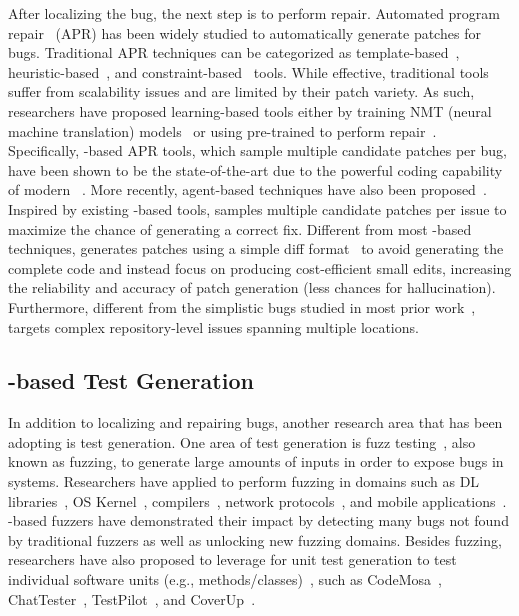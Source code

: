 %

After localizing the bug, the next step is to perform repair. 
Automated program repair~\cite{gazzola2019aprsurvey} (APR) has been widely studied to automatically generate patches for bugs. 
Traditional APR techniques can be categorized as template-based~\cite{liu2019tbar, ghanbari2019prapr}, heuristic-based~\cite{legoues2012genprog, le2016hdrepair}, and constraint-based~\cite{mechtaev2016angelix, long2015spr} tools. 
While effective, traditional \apr tools suffer from scalability issues and are limited by their patch variety.
As such, researchers have proposed learning-based \apr tools either by training NMT (neural machine translation) models~\cite{jiang2021cure, li2020dlfix, chen2018sequencer, zhu2021recoder} or using pre-trained  to perform repair~\cite{alpharepair, xia2023repairstudy, kolak2022patch, zhang2024systematicapr}.
Specifically, \llm-based APR tools, which sample multiple candidate patches per bug, have been shown to be the state-of-the-art due to the powerful coding capability of modern ~\cite{xia2023repairstudy}. More recently, agent-based \apr techniques have also been proposed~\cite{chatrepair, bouzenia2024repairagent, hidvegi2024cigar, chen2024flakiness, zhang2024acfix}. 
Inspired by existing \llm-based \apr tools, \tech samples multiple candidate patches per issue to maximize the chance of generating a correct fix. Different from most \llm-based \apr techniques, \tech generates patches using a simple diff format~\cite{aidar} to avoid generating the complete code and instead focus on producing cost-efficient small edits, increasing the reliability and accuracy of patch generation (less chances for hallucination).
Furthermore, different from the simplistic bugs studied in most prior work~\cite{xia2023repairstudy}, \tech targets complex repository-level issues spanning multiple locations. 
%

%

\subsection{\llm-based Test Generation}

In addition to localizing and repairing bugs, another research area that has been adopting \llm is test generation. 
One area of test generation is fuzz testing~\cite{zeller2019fuzzing}, also known as fuzzing, to generate large amounts of inputs in order to expose bugs in systems. 
Researchers have applied  to perform fuzzing in domains such as DL libraries~\cite{titanfuzz, deng2023fuzzgpt}, OS Kernel~\cite{yang2023kernelgpt, oliinyk2024fuzzing}, compilers~\cite{fuzz4all,yang2023whitebox, ou2024mutators}, network protocols~\cite{meng2024large}, and mobile applications~\cite{liu2024make}. 
%
\llm-based fuzzers have demonstrated their impact by detecting many bugs not found by traditional fuzzers as well as unlocking new fuzzing domains.
Besides fuzzing, researchers have also proposed to leverage  for unit test generation to test individual software units (e.g., methods/classes)~\cite{liu2024largesurvey}, such as CodeMosa~\cite{lemieux2023codamosa}, ChatTester~\cite{yuan2024evaluating}, TestPilot~\cite{schafer2023testpilot}, and CoverUp~\cite{pizzorno2024coverup}.



